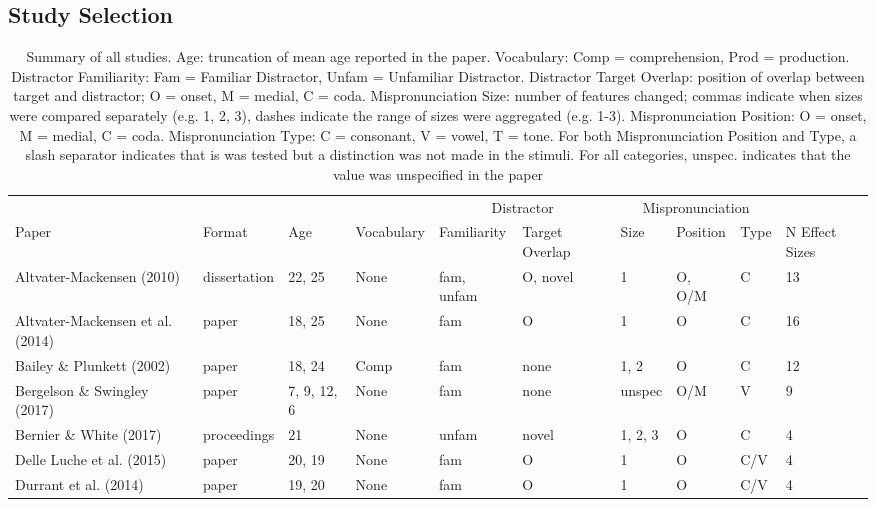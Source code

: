 \documentclass[man]{apa6}
\makeatletter
\newenvironment{lltable}{\begin{landscape}\begin{center}\begin{ThreePartTable}}{\end{ThreePartTable}\end{center}\end{landscape}}
\newcommand\LastLTentrywidth{1em}
\newlength\longtablewidth
\newcommand{\getlongtablewidth}{\begingroup \ifcsname LT@\roman{LT@tables}\endcsname \global\longtablewidth=0pt \renewcommand{\LT@entry}[2]{\global\advance\longtablewidth by ##2\relax\gdef\LastLTentrywidth{##2}}\@nameuse{LT@\roman{LT@tables}} \fi \endgroup}
\makeatother
\begin{document}
\hypertarget{study-selection}{%
\subsection{Study Selection}\label{study-selection}}

\begin{lltable}


\scriptsize{
\begin{longtable}{llllllllll}\noalign{\getlongtablewidth\global\LTcapwidth=\longtablewidth}
\caption{\label{tab:SummaryTable}Summary of all studies. Age: truncation of mean age reported in the paper. Vocabulary: Comp = comprehension, Prod = production. Distractor Familiarity: Fam = Familiar Distractor, Unfam = Unfamiliar Distractor. Distractor Target Overlap: position of overlap between target and distractor; O = onset, M = medial, C = coda. Mispronunciation Size: number of features changed; commas indicate when sizes were compared separately (e.g. 1, 2, 3), dashes indicate the range of sizes were aggregated (e.g. 1-3). Mispronunciation Position: O = onset, M = medial, C = coda. Mispronunciation Type: C = consonant, V = vowel, T = tone. For both Mispronunciation Position and Type, a slash separator indicates that is was tested but a distinction was not made in the stimuli. For all categories, unspec. indicates that the value was unspecified in the paper}\\
\toprule
 &  &  &  & \multicolumn{2}{c}{Distractor} & \multicolumn{3}{c}{Mispronunciation}  &\\
\cmidrule(r){5-6} \cmidrule(r){7-9}
Paper & Format & Age & Vocabulary & Familiarity & Target Overlap & Size & Position & Type & N Effect Sizes\\
\midrule
Altvater-Mackensen (2010) & dissertation & 22, 25 & None & fam, unfam & O, novel & 1 & O, O/M & C & 13\\
Altvater-Mackensen et al. (2014) & paper & 18, 25 & None & fam & O & 1 & O & C & 16\\
Bailey \& Plunkett (2002) & paper & 18, 24 & Comp & fam & none & 1, 2 & O & C & 12\\
Bergelson \& Swingley (2017) & paper & 7, 9, 12, 6 & None & fam & none & unspec & O/M & V & 9\\
Bernier \& White (2017) & proceedings & 21 & None & unfam & novel & 1, 2, 3 & O & C & 4\\
Delle Luche et al. (2015) & paper & 20, 19 & None & fam & O & 1 & O & C/V & 4\\
Durrant et al. (2014) & paper & 19, 20 & None & fam & O & 1 & O & C/V & 4\\

\end{longtable}}
\end{lltable}
\end{document}

